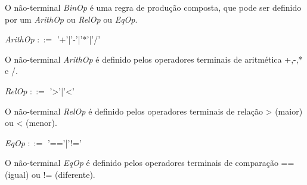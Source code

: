 \documentclass{scrreprt}
\begin{document}
\par O não-terminal \textit{BinOp} é uma regra de produção composta, que pode ser definido por um \textit{ArithOp} ou \textit{RelOp} ou \textit{EqOp}.

\begin{center}
\textit{ArithOp }$::=$ '+'|'-'|'*'|'/'
\end{center}

\par O não-terminal \textit{ArithOp} é definido pelos operadores terminais de aritmética +,-,* e /. 

\begin{center}
\textit{RelOp }$::=$ '>'|'<'
\end{center}

\par O não-terminal \textit{RelOp} é definido pelos operadores terminais de relação > (maior) ou < (menor). 

\begin{center}
\textit{EqOp }$::=$ '=='|'!='
\end{center}

\par O não-terminal \textit{EqOp} é definido pelos operadores terminais de comparação == (igual) ou != (diferente). 
\end{document}
